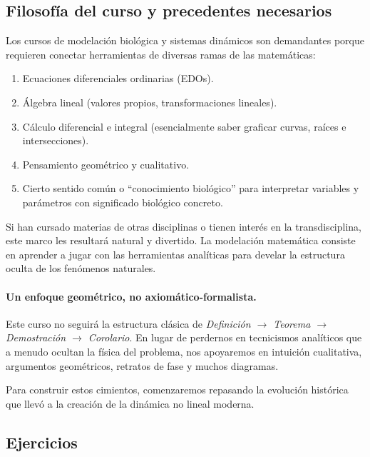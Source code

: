 \subsection{Filosofía del curso y precedentes necesarios}

Los cursos de modelación biológica y sistemas dinámicos son demandantes porque requieren conectar herramientas de diversas ramas de las matemáticas:
\begin{enumerate}
    \item Ecuaciones diferenciales ordinarias (EDOs).
    \item Álgebra lineal (valores propios, transformaciones lineales).
    \item Cálculo diferencial e integral (esencialmente saber graficar curvas, raíces e intersecciones).
    \item Pensamiento geométrico y cualitativo.
    \item Cierto sentido común o ``conocimiento biológico'' para interpretar variables y parámetros con significado biológico concreto.
\end{enumerate}

Si han cursado materias de otras disciplinas o tienen interés en la transdisciplina, este marco les resultará natural y divertido. La modelación matemática consiste en aprender a jugar con las herramientas analíticas para develar la estructura oculta de los fenómenos naturales.

\paragraph{Un enfoque geométrico, no axiomático-formalista.}
Este curso no seguirá la estructura clásica de \emph{Definición $\to$ Teorema $\to$ Demostración $\to$ Corolario}. En lugar de perdernos en tecnicismos analíticos que a menudo ocultan la física del problema, nos apoyaremos en intuición cualitativa, argumentos geométricos, retratos de fase y muchos diagramas.

Para construir estos cimientos, comenzaremos repasando la evolución histórica que llevó a la creación de la dinámica no lineal moderna.

\subsection{Ejercicios}

